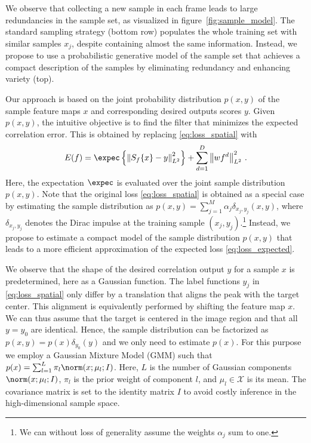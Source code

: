 \documentclass[10pt,twocolumn,letterpaper]{article}
\begin{document}
We observe that collecting a new sample in each frame leads to large redundancies in the sample set, as visualized in figure~\ref{fig:sample_model}. The standard sampling strategy (bottom row) populates the whole training set with similar samples $x_j$, despite containing almost the same information. Instead, we propose to use a probabilistic generative model of the sample set that achieves a compact description of the samples by eliminating redundancy and enhancing variety (top).

Our approach is based on the joint probability distribution $p(x,y)$ of the sample feature maps $x$ and corresponding desired outputs scores $y$. Given $p(x,y)$, the intuitive objective is to find the filter that minimizes the expected correlation error. This is obtained by replacing \eqref{eq:loss_spatial} with\begin{equation}
\label{eq:loss_expected}
E(f) = \expec \left\{ \left\| S_f\{x\} - y \right\|^2_{L^2} \right\} + \sum_{d=1}^{D} \left\| w f^d \right\|^2_{L^2} \,.
\end{equation}
Here, the expectation $\expec$ is evaluated over the joint sample distribution $p(x,y)$. Note that the original loss \eqref{eq:loss_spatial} is obtained as a special case by estimating the sample distribution as $p(x,y) = \sum_{j=1}^{M} \alpha_j \delta_{x_j,y_j}(x,y)$, where $\delta_{x_j,y_j}$ denotes the Dirac impulse at the training sample $(x_j,y_j)$.\footnote{We can without loss of generality assume the weights $\alpha_j$ sum to one.} 
Instead, we propose to estimate a compact model of the sample distribution $p(x,y)$ that leads to a more efficient approximation of the expected loss \eqref{eq:loss_expected}.

We observe that the shape of the desired correlation output $y$ for a sample $x$ is predetermined, here as a Gaussian function. The label functions $y_j$ in \eqref{eq:loss_spatial} only differ by a translation that aligns the peak with the target center. This alignment is equivalently performed by shifting the feature map $x$. We can thus assume that the target is centered in the image region and that all $y=y_0$ are identical. 
Hence, the sample distribution can be factorized as $p(x,y) = p(x) \delta_{y_0}(y)$ and we only need to estimate $p(x)$.
For this purpose we employ a Gaussian Mixture Model (GMM) 
such that $p(x) = \sum_{l=1}^{L} \pi_l \norm(x; \mu_l; I)$. Here, $L$ is the number of Gaussian components $\norm(x; \mu_l; I)$, $\pi_l$ is the prior weight of component $l$, and $\mu_l \in \mathcal{X}$ is its mean. The covariance matrix is set to the identity matrix $I$ to avoid costly inference in the high-dimensional sample space.
\end{document}
